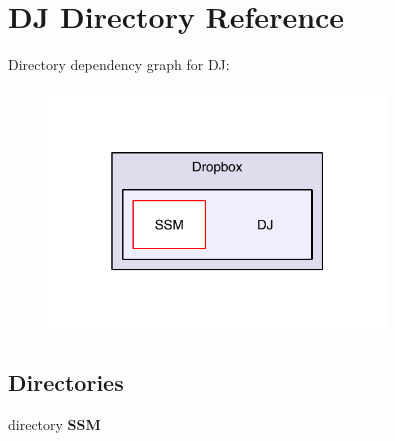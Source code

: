 \section{D\-J Directory Reference}
\label{dir_beeca0844f0b986207508ef8a897f9be}
Directory dependency graph for D\-J\-:\nopagebreak
\begin{figure}[H]
\begin{center}
\leavevmode
\includegraphics[width=254pt]{dir_beeca0844f0b986207508ef8a897f9be_dep}
\end{center}
\end{figure}
\subsection*{Directories}
\begin{DoxyCompactItemize}
\item 
directory {\bf S\-S\-M}
\end{DoxyCompactItemize}
